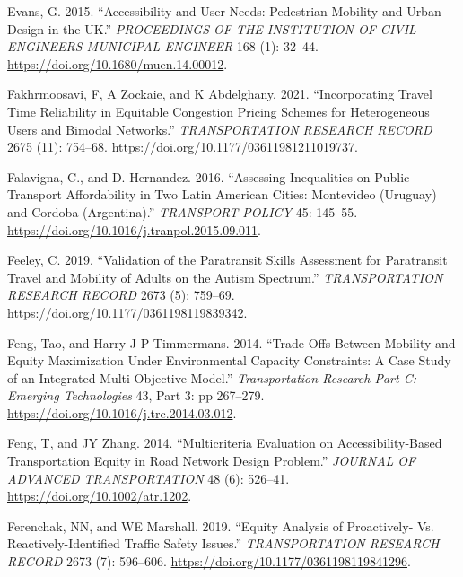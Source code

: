 \documentclass[12pt, oneside]{report}
\newlength{\cslhangindent}
\newlength{\cslentryspacingunit} %
\newenvironment{CSLReferences}[2] %
 {%
  \setlength{\parindent}{0pt}
  \ifodd #1
  \let\oldpar\par
  \def\par{\hangindent=\cslhangindent\oldpar}
  \fi
  \setlength{\parskip}{#2\cslentryspacingunit}
 }%
 {}
\begin{document}
\begin{CSLReferences}{1}{0}
\leavevmode{}%
Evans, G. 2015. {``Accessibility and User Needs: Pedestrian Mobility and
Urban Design in the {UK}.''} \emph{PROCEEDINGS OF THE INSTITUTION OF
CIVIL ENGINEERS-MUNICIPAL ENGINEER} 168 (1): 32--44.
\url{https://doi.org/10.1680/muen.14.00012}.

\leavevmode{}%
Fakhrmoosavi, F, A Zockaie, and K Abdelghany. 2021. {``Incorporating
{Travel Time Reliability} in {Equitable Congestion Pricing Schemes} for
{Heterogeneous Users} and {Bimodal Networks}.''} \emph{TRANSPORTATION
RESEARCH RECORD} 2675 (11): 754--68.
\url{https://doi.org/10.1177/03611981211019737}.

\leavevmode{}%
Falavigna, C., and D. Hernandez. 2016. {``Assessing Inequalities on
Public Transport Affordability in Two Latin {American} Cities:
{Montevideo} ({Uruguay}) and {Cordoba} ({Argentina}).''} \emph{TRANSPORT
POLICY} 45: 145--55.
\url{https://doi.org/10.1016/j.tranpol.2015.09.011}.

\leavevmode{}%
Feeley, C. 2019. {``Validation of the {Paratransit Skills Assessment}
for {Paratransit Travel} and {Mobility} of {Adults} on the {Autism
Spectrum}.''} \emph{TRANSPORTATION RESEARCH RECORD} 2673 (5): 759--69.
\url{https://doi.org/10.1177/0361198119839342}.

\leavevmode{}%
Feng, Tao, and Harry J P Timmermans. 2014. {``Trade-Offs Between
Mobility and Equity Maximization Under Environmental Capacity
Constraints: {A} Case Study of an Integrated Multi-Objective Model.''}
\emph{Transportation Research Part C: Emerging Technologies} 43, Part 3:
pp 267--279. \url{https://doi.org/10.1016/j.trc.2014.03.012}.

\leavevmode{}%
Feng, T, and JY Zhang. 2014. {``Multicriteria Evaluation on
Accessibility-Based Transportation Equity in Road Network Design
Problem.''} \emph{JOURNAL OF ADVANCED TRANSPORTATION} 48 (6): 526--41.
\url{https://doi.org/10.1002/atr.1202}.

\leavevmode{}%
Ferenchak, NN, and WE Marshall. 2019. {``Equity {Analysis} of
{Proactively-} Vs. {Reactively-Identified Traffic Safety Issues}.''}
\emph{TRANSPORTATION RESEARCH RECORD} 2673 (7): 596--606.
\url{https://doi.org/10.1177/0361198119841296}.


\end{CSLReferences}
\end{document}
